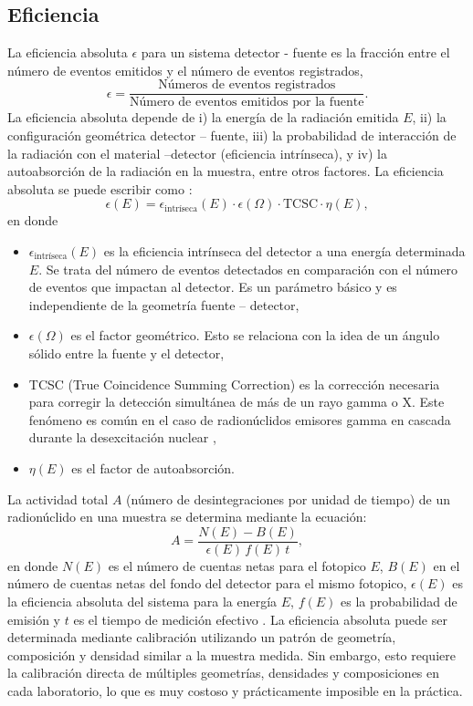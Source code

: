 	\subsection{Eficiencia}\label{SubSec-Eficiencia}
La eficiencia absoluta $\epsilon$ para un sistema detector - fuente es la fracción entre el número de eventos emitidos y el número de eventos registrados, 
\begin{equation}
\epsilon = \dfrac{\text{Números de eventos registrados}}{\text{Número de eventos emitidos por la fuente}}.
\end{equation}
La eficiencia absoluta depende de i) la energía de la radiación emitida $E$, ii) la configuración geométrica detector – fuente, iii) la probabilidad de interacción de la radiación con el material –detector (eficiencia intrínseca), y iv)  la autoabsorción de la radiación en la muestra, entre otros factores. La eficiencia absoluta se puede escribir como \cite{PALACIOS200877}:
\begin{equation}
\epsilon(E) = \epsilon_{\text{intríseca}}(E)\cdot \epsilon(\Omega)\cdot\text{TCSC}\cdot \eta(E), 
\end{equation}
en donde 
\begin{itemize}
\item $\epsilon_{\text{intríseca}}(E)$ es la eficiencia intrínseca del detector a una energía determinada $E$. Se trata del número de eventos detectados en comparación con el número de eventos que impactan al detector. Es un parámetro básico y es independiente de la geometría fuente – detector,
\item $\epsilon(\Omega)$ es el factor geométrico. Esto se relaciona con la idea de un ángulo sólido entre la fuente y el detector,
\item TCSC (True Coincidence Summing Correction) es la corrección necesaria para corregir la detección simultánea de más de un rayo gamma o X. Este fenómeno es común en el caso de radionúclidos emisores gamma en cascada durante la desexcitación nuclear \cite{gilmore2008},
\item $\eta(E)$ es el factor de autoabsorción.
\end{itemize}
La actividad total $A$ (número de desintegraciones por unidad de tiempo) de un radionúclido en una muestra se determina mediante la ecuación: \cite{MONTALVANOLIVARES201734}
\begin{equation}\label{Eq-Actividad}
A = \dfrac{N(E) - B(E)}{\epsilon(E)\,f(E)\,t},
\end{equation}
en donde $N(E)$ es el número de cuentas netas para el fotopico $E$, $B(E)$ en el número de cuentas netas del fondo del detector para el mismo fotopico,  $\epsilon(E)$ es la eficiencia absoluta del sistema para la energía $E$, $f(E)$ es la probabilidad de emisión y $t$ es el tiempo de medición efectivo \cite{BELGIN201536}. La eficiencia absoluta puede ser determinada mediante calibración utilizando un patrón de geometría, composición y densidad similar a la muestra medida. Sin embargo, esto requiere la calibración directa de múltiples geometrías, densidades y composiciones en cada laboratorio, lo que es muy costoso y prácticamente imposible en la práctica.
